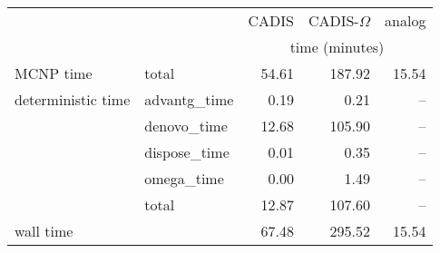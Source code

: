 \begin{tabular}{llrrr}
\toprule
          &             &          CADIS & CADIS-$\Omega$ &         analog \\
        &              & \multicolumn{3}{c}{time (minutes)} \\
\midrule
MCNP time & total &          54.61 &         187.92 &          15.54 \\
deterministic time & advantg\_time &           0.19 &           0.21 &            -- \\
          & denovo\_time &          12.68 &         105.90 &            -- \\
          & dispose\_time &           0.01 &           0.35 &            -- \\
          & omega\_time &           0.00 &           1.49 &            -- \\
          & total &          12.87 &         107.60 &            -- \\
wall time &              &          67.48 &         295.52 &          15.54 \\
\bottomrule
\end{tabular}
